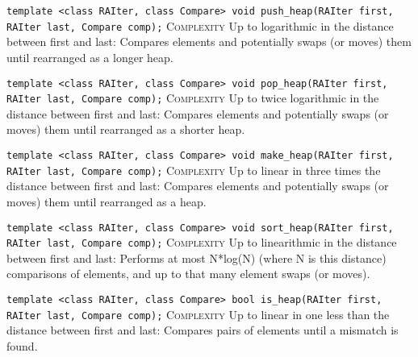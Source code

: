 \noindent{}\hspace*{0.25em}\lstinline[basicstyle=\ttfamily\color{clime}]{template <class RAIter, class Compare> void push_heap(RAIter first, RAIter last, Compare comp);} \textsc{Complexity} Up to logarithmic in the distance between first and last: Compares elements and potentially swaps (or moves) them until rearranged as a longer heap.\\\vspace{-0.6em}

\noindent{}\hspace*{0.25em}\lstinline[basicstyle=\ttfamily\color{clime}]{template <class RAIter, class Compare> void pop_heap(RAIter first, RAIter last, Compare comp);} \textsc{Complexity} Up to twice logarithmic in the distance between first and last: Compares elements and potentially swaps (or moves) them until rearranged as a shorter heap.\\\vspace{-0.6em}

\noindent{}\hspace*{0.25em}\lstinline[basicstyle=\ttfamily\color{corange}]{template <class RAIter, class Compare> void make_heap(RAIter first, RAIter last, Compare comp);} \textsc{Complexity} Up to linear in three times the distance between first and last: Compares elements and potentially swaps (or moves) them until rearranged as a heap.\\\vspace{-0.6em}

\noindent{}\hspace*{0.25em}\lstinline[basicstyle=\ttfamily\color{cred}]{template <class RAIter, class Compare> void sort_heap(RAIter first, RAIter last, Compare comp);} \textsc{Complexity} Up to linearithmic in the distance between first and last: Performs at most N*log(N) (where N is this distance) comparisons of elements, and up to that many element swaps (or moves).\\\vspace{-0.6em}

\noindent{}\hspace*{0.25em}\lstinline[basicstyle=\ttfamily\color{corange}]{template <class RAIter, class Compare> bool is_heap(RAIter first, RAIter last, Compare comp);} \textsc{Complexity} Up to linear in one less than the distance between first and last: Compares pairs of elements until a mismatch is found.\\\vspace{-0.6em}

